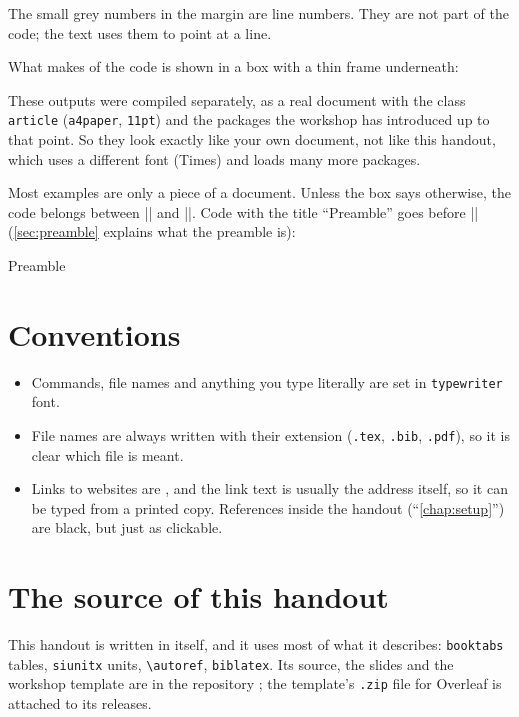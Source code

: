 The small grey numbers in the margin are line numbers.
They are not part of the code; the text uses them to point at a line.

What  makes of the code is shown in a box with a thin frame underneath:


These outputs were compiled separately, as a real document
with the class \texttt{article} (\texttt{a4paper}, \texttt{11pt})
and the packages the workshop has introduced up to that point.
So they look exactly like your own document, not like this handout,
which uses a different font (Times) and loads many more packages.

Most examples are only a piece of a document.
Unless the box says otherwise,
the code belongs between \code|| and \code||.
Code with the title \enquote{Preamble} goes before \code||
(\autoref{sec:preamble} explains what the preamble is):

\begin{codeblocktitled}{Preamble}
\usepackage{parskip}
\end{codeblocktitled}

\section*{Conventions}

\begin{itemize}
    \item Commands, file names and anything you type literally are set in \texttt{typewriter} font.
    \item File names are always written with their extension (\texttt{.tex}, \texttt{.bib}, \texttt{.pdf}),
        so it is clear which file is meant.
    \item Links to websites are ,
        and the link text is usually the address itself, so it can be typed from a printed copy.
        References inside the handout (\enquote{\autoref{chap:setup}}) are black, but just as clickable.
\end{itemize}

\section*{The source of this handout}\label{sec:about-source}

This handout is written in  itself,
and it uses most of what it describes:
\texttt{booktabs} tables, \texttt{siunitx} units, \texttt{\textbackslash autoref}, \texttt{biblatex}.
Its source, the slides and the workshop template are in the repository
\myhref{\repourl}{\repodisplay};
the template's \texttt{.zip} file for Overleaf is attached to its releases.
